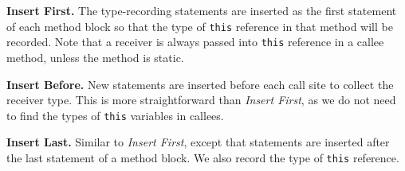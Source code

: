 \documentclass{fac}
\begin{document}
\textbf{Insert First.}
The type-recording statements are inserted as the first statement of each method block so that the type of \texttt{this} reference in that method will be recorded. %
Note that a receiver is always passed into \texttt{this} reference in a callee method, unless the method is static. %

\textbf{Insert Before.}
New statements are inserted  before each call site to collect the receiver type. This is more straightforward than \emph{Insert First}, as we do not need to find the types of \texttt{this} variables in callees.

\textbf{Insert Last.}
Similar to \emph{Insert First}, except that statements are inserted after the last statement of a method block. We also record the type of \texttt{this} reference. %
\end{document}
